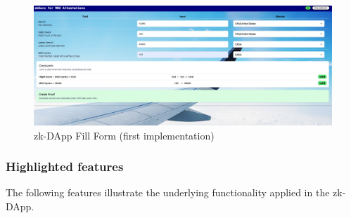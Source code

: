\begin{figure}[hbt]
	\centering
		\includegraphics[width=1.0\textwidth]{Pictures/form.png}
	\caption{zk-DApp Fill Form (first implementation)}
	\label{fig:form}
\end{figure}

\subsubsection{Highlighted features}
The following features illustrate the underlying functionality applied in the zk-DApp.


